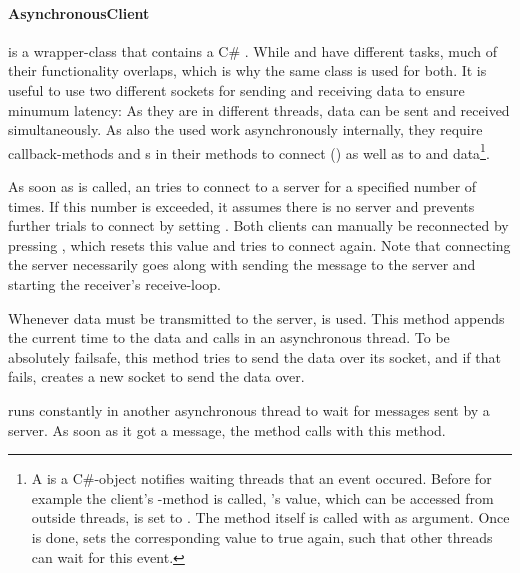 \paragraph{AsynchronousClient} is a wrapper-class that contains a C\# . While  and  have different tasks, much of their functionality overlaps, which is why the same class is used for both. It is useful to use two different sockets for sending and receiving data to ensure minumum latency: As they are in different threads, data can be sent and received simultaneously. As also the used  work asynchronously internally, they require callback-methods and s in their methods to connect () as well as to  and  data\footnote{A  is a C\#-object notifies waiting threads that an event occured. Before for example the client's -method is called, 's value, which can be accessed from outside threads, is set to . The method itself is called with  as argument. Once  is done,  sets the corresponding value to true again, such that other threads can wait for this event.}.

As soon as  is called, an  tries to connect to a server for a specified number of times. If this number is exceeded, it assumes there is no server and prevents further trials to connect by setting . Both clients can manually be reconnected by pressing , which resets this value and tries to connect again. Note that connecting the server necessarily goes along with sending the message  to the server and starting the receiver's receive-loop. 

Whenever data must be transmitted to the server,  is used. This method appends the current time to the data and calls  in an asynchronous thread. To be absolutely failsafe, this method tries to send the data over its socket, and if that fails, creates a new socket to send the data over. 

 runs constantly in another asynchronous thread to wait for messages sent by a server. As soon as it got a message, the method  calls  with this method.

